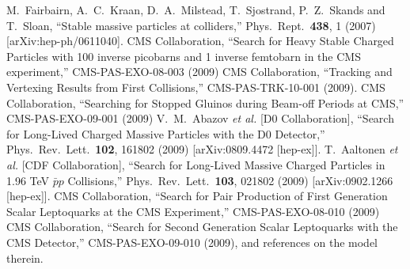\documentclass{cmspaper}
\begin{document}
\begin{thebibliography}{0}
  M.~Fairbairn, A.~C.~Kraan, D.~A.~Milstead, T.~Sjostrand, P.~Z.~Skands and T.~Sloan,
  ``Stable massive particles at colliders,''
  Phys.\ Rept.\  {\bf 438}, 1 (2007)
  [arXiv:hep-ph/0611040].
 CMS Collaboration,
 ``Search for Heavy Stable Charged Particles with 100 inverse picobarns and 1 inverse femtobarn in the CMS experiment,''
 CMS-PAS-EXO-08-003 (2009)
 CMS Collaboration,
 ``Tracking and Vertexing Results from First Collisions,''
 CMS-PAS-TRK-10-001 (2009).
  CMS Collaboration,
  ``Searching for Stopped Gluinos during Beam-off Periods at CMS,''
  CMS-PAS-EXO-09-001 (2009)
  V.~M.~Abazov {\it et al.}  [D0 Collaboration],
  ``Search for Long-Lived Charged Massive Particles with the D0 Detector,''
  Phys.\ Rev.\ Lett.\  {\bf 102}, 161802 (2009)
  [arXiv:0809.4472 [hep-ex]].
\quad
  T.~Aaltonen {\it et al.}  [CDF Collaboration],
  ``Search for Long-Lived Massive Charged Particles in 1.96 TeV $\bar{p}p$ Collisions,''
  Phys.\ Rev.\ Lett.\  {\bf 103}, 021802 (2009)
  [arXiv:0902.1266 [hep-ex]].
  CMS Collaboration,
  ``Search for Pair Production of First Generation Scalar Leptoquarks at the CMS Experiment,''
  CMS-PAS-EXO-08-010 (2009)
\quad 
  CMS Collaboration,
  ``Search for Second Generation Scalar Leptoquarks with the CMS Detector,''
  CMS-PAS-EXO-09-010 (2009), and references on the model therein.
\end{thebibliography}


%
%

\end{document}
